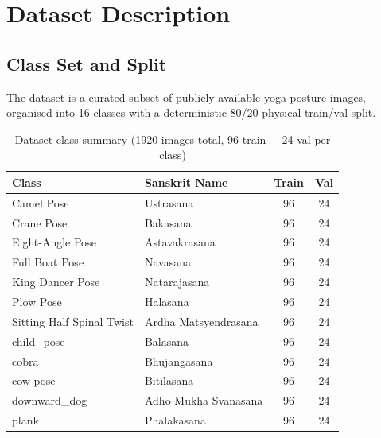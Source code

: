 \documentclass[12pt,a4paper]{article}
\begin{document}
\section{Dataset Description}

\subsection{Class Set and Split}
The dataset is a curated subset of publicly available yoga posture images, organised
into 16 classes with a deterministic 80/20 physical train/val split.

\begin{table}[H]
\centering\small
\caption{Dataset class summary (1920 images total, 96 train + 24 val per class)}
\renewcommand{\arraystretch}{1.15}
\begin{tabular}{@{}llcc@{}}
\toprule
\textbf{Class} & \textbf{Sanskrit Name} & \textbf{Train} & \textbf{Val} \\
\midrule
\rowcolor{lightblue!30} Camel Pose          & Ustrasana                 & 96 & 24 \\
Crane Pose                                  & Bakasana                  & 96 & 24 \\
\rowcolor{lightblue!30} Eight-Angle Pose    & Astavakrasana             & 96 & 24 \\
Full Boat Pose                              & Navasana                  & 96 & 24 \\
\rowcolor{lightblue!30} King Dancer Pose    & Natarajasana              & 96 & 24 \\
Plow Pose                                   & Halasana                  & 96 & 24 \\
\rowcolor{lightblue!30} Sitting Half Spinal Twist & Ardha Matsyendrasana & 96 & 24 \\
child\_pose                                 & Balasana                  & 96 & 24 \\
\rowcolor{lightblue!30} cobra               & Bhujangasana              & 96 & 24 \\
cow pose                                    & Bitilasana                & 96 & 24 \\
\rowcolor{lightblue!30} downward\_dog       & Adho Mukha Svanasana      & 96 & 24 \\
plank                                       & Phalakasana               & 96 & 24 \\

\end{tabular}
\end{table}
\end{document}
